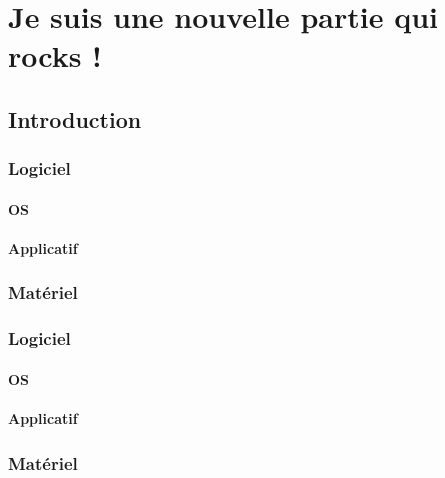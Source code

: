



\maketitle
\tableofcontents 

\part{Je suis une nouvelle partie qui rocks !}
\chapter{Introduction}
\section{Logiciel}
\subsection{OS}
\subsection{Applicatif}
\section{Matériel}
\section{Logiciel}
\subsection{OS}
\subsection{Applicatif}
\section{Matériel}



